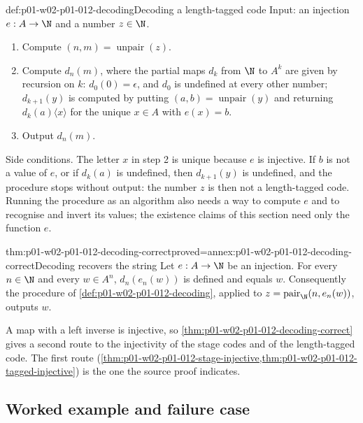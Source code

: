 \begin{hbmethod}{def:p01-w02-p01-012-decoding}{Decoding a length-tagged code}
Input: an injection \(e:A\to\N\) and a number \(z\in\N\).
\begin{enumerate}
  \item Compute \((n,m)=\operatorname{unpair}(z)\).
  \item Compute \(d_n(m)\), where the partial maps \(d_k\) from \(\N\) to
        \(A^k\) are given by recursion on \(k\):
        \(d_0(0)=\epsilon\), and \(d_0\) is undefined at every other number;
        \(d_{k+1}(y)\) is computed by putting
        \((a,b)=\operatorname{unpair}(y)\) and returning
        \(d_k(a)\langle x\rangle\) for the unique \(x\in A\) with
        \(e(x)=b\).
  \item Output \(d_n(m)\).
\end{enumerate}
Side conditions. The letter \(x\) in step 2 is unique because \(e\) is
injective. If \(b\) is not a value of \(e\), or if \(d_k(a)\) is undefined,
then \(d_{k+1}(y)\) is undefined, and the procedure stops without output: the
number \(z\) is then not a length-tagged code. Running the procedure as an
algorithm also needs a way to compute \(e\) and to recognise and invert its
values; the existence claims of this section need only the function \(e\).
\end{hbmethod}

\begin{hblemma}{thm:p01-w02-p01-012-decoding-correct}{proved=annex:p01-w02-p01-012-decoding-correct}{Decoding recovers the string}
Let \(e:A\to\N\) be an injection. For every \(n\in\N\) and every
\(w\in A^n\), \(d_n(e_n(w))\) is defined and equals \(w\). Consequently the
procedure of \cref{def:p01-w02-p01-012-decoding}, applied to
\(z=\operatorname{pair}_{\N}(n,e_n(w))\), outputs \(w\).
\end{hblemma}

A map with a left inverse is injective, so
\cref{thm:p01-w02-p01-012-decoding-correct} gives a second route to the
injectivity of the stage codes and of the length-tagged code. The first route
(\cref{thm:p01-w02-p01-012-stage-injective,thm:p01-w02-p01-012-tagged-injective})
is the one the source proof indicates.

\subsection{Worked example and failure case}
\label{sec:p01-w02-p01-012-example}


